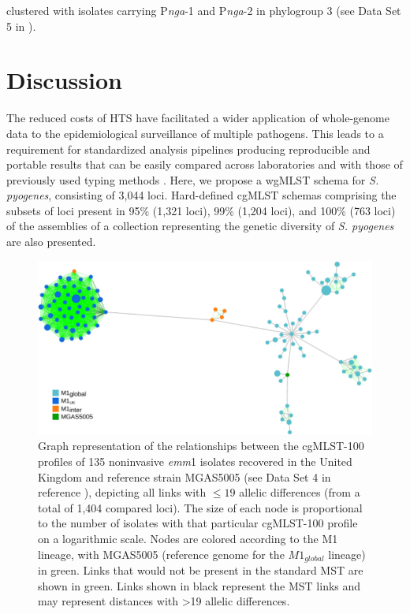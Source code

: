 clustered with isolates carrying P\textit{nga}-1 and P\textit{nga}-2 in phylogroup 3 (see Data Set 5 in \cite{friaes_supplemental_2023}).

\section{Discussion} \label{sec:ch4_discussion}

The reduced costs of \ac{HTS} have facilitated a wider application of whole-genome data to the epidemiological surveillance of multiple pathogens. This leads to a requirement for standardized analysis pipelines producing reproducible and portable results that can be easily compared across laboratories and with those of previously used typing methods \cite{sabat_overview_2013}. Here, we propose a \ac{wgMLST} schema for \textit{S. pyogenes}, consisting of 3,044 loci. Hard-deﬁned \ac{cgMLST} schemas comprising the subsets of loci present in 95\% (1,321 loci), 99\% (1,204 loci), and 100\% (763 loci) of the assemblies of a collection representing the genetic diversity of \textit{S. pyogenes} \cite{davies_atlas_2019} are also presented.

\begin{figure}[h!]
    \centering
    \includegraphics[width=\textwidth]{figures/chapter 4/Figure5.pdf}
    \caption[Graph representation of the relationships between the cgMLST-100 proﬁles of 135 noninvasive \textit{emm}1 isolates recovered in the United Kingdom and reference strain MGAS5005, depicting all links with $\leq19$ allelic differences (from a total of 1,404 compared loci).]{Graph representation of the relationships between the cgMLST-100 proﬁles of 135 noninvasive \textit{emm}1 isolates recovered in the United Kingdom \cite{lynskey_emergence_2019} and reference strain MGAS5005 (see Data Set 4 in reference \cite{friaes_supplemental_2023}), depicting all links with $\leq19$ allelic differences (from a total of 1,404 compared loci). The size of each node is proportional to the number of isolates with that particular cgMLST-100 proﬁle on a logarithmic scale. Nodes are colored according to the M1 lineage, with MGAS5005 (reference genome for the $M1_{global}$ lineage) in green. Links that would not be present in the standard \ac{MST} are shown in green. Links shown in black represent the \ac{MST} links and may represent distances with >19 allelic differences.}
    \label{fig:chap4_figure5}
\end{figure}

